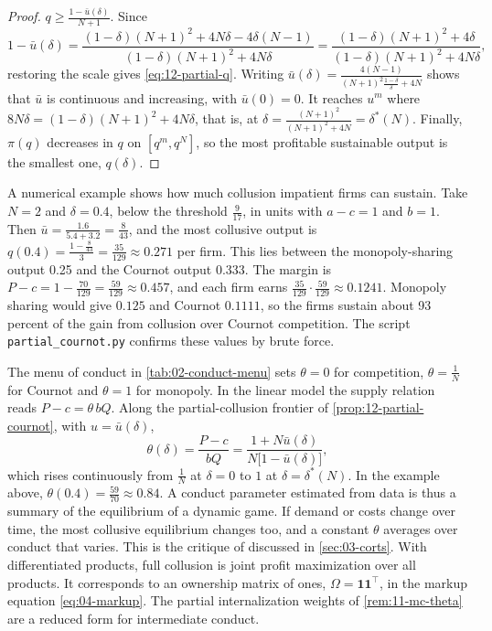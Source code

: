 \begin{proof}
$q \ge \frac{1 - \bar u(\delta)}{N + 1}$. Since
\begin{equation*}
1 - \bar u(\delta) = \frac{(1 - \delta)(N + 1)^2 + 4N\delta - 4\delta(N - 1)}{(1 - \delta)(N + 1)^2 + 4N\delta}
= \frac{(1 - \delta)(N + 1)^2 + 4\delta}{(1 - \delta)(N + 1)^2 + 4N\delta} ,
\end{equation*}
restoring the scale gives \eqref{eq:12-partial-q}. Writing
$\bar u(\delta) = \frac{4(N - 1)}{(N + 1)^2\frac{1 - \delta}{\delta} + 4N}$ shows that $\bar u$ is continuous and
increasing, with $\bar u(0) = 0$. It reaches $u^m$ where $8N\delta = (1 - \delta)(N + 1)^2 + 4N\delta$, that is, at
$\delta = \frac{(N + 1)^2}{(N + 1)^2 + 4N} = \delta^*(N)$. Finally, $\pi(q)$ decreases in $q$ on $[q^m, q^N]$, so the
most profitable sustainable output is the smallest one, $q(\delta)$.
\end{proof}

A numerical example shows how much collusion impatient firms can sustain. Take $N = 2$ and $\delta = 0.4$, below the
threshold $\frac{9}{17}$, in units with $a - c = 1$ and $b = 1$. Then $\bar u = \frac{1.6}{5.4 + 3.2} = \frac{8}{43}$,
and the most collusive output is $q(0.4) = \frac{1 - \frac{8}{43}}{3} = \frac{35}{129} \approx 0.271$ per firm. This
lies between the monopoly-sharing output 0.25 and the Cournot output 0.333. The margin is
$P - c = 1 - \frac{70}{129} = \frac{59}{129} \approx 0.457$, and each firm earns $\frac{35}{129}\cdot\frac{59}{129}
\approx 0.1241$. Monopoly sharing would give $0.125$ and Cournot $0.1111$, so the firms sustain about 93 percent of
the gain from collusion over Cournot competition. The script \texttt{partial\_cournot.py} confirms these values by
brute force.

\begin{remark}\label{rem:12-conduct}
The menu of conduct in \cref{tab:02-conduct-menu} sets $\theta = 0$ for competition, $\theta = \frac{1}{N}$ for
Cournot and $\theta = 1$ for monopoly. In the linear model the supply relation reads $P - c = \theta\,bQ$. Along the
partial-collusion frontier of \cref{prop:12-partial-cournot}, with $u = \bar u(\delta)$,
\begin{equation*}
\theta(\delta) = \frac{P - c}{bQ} = \frac{1 + N\bar u(\delta)}{N\bigl[1 - \bar u(\delta)\bigr]} ,
\end{equation*}
which rises continuously from $\frac{1}{N}$ at $\delta = 0$ to $1$ at $\delta = \delta^*(N)$. In the example above,
$\theta(0.4) = \frac{59}{70} \approx 0.84$. A conduct parameter estimated from data is thus a summary of the
equilibrium of a dynamic game. If demand or costs change over time, the most collusive equilibrium changes too, and a
constant $\theta$ averages over conduct that varies. This is the critique of \citet{Corts1999} discussed in
\cref{sec:03-corts}. With differentiated products, full collusion is joint profit maximization over all products. It
corresponds to an ownership matrix of ones, $\Omega = \mathbf{1}\mathbf{1}^\top$, in the markup equation
\eqref{eq:04-markup}. The partial internalization weights of \cref{rem:11-mc-theta} are a reduced form for
intermediate conduct.
\end{remark}

